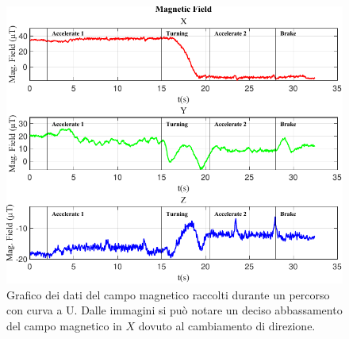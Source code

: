 \documentclass[class=article]{standalone}
\begin{document}
	\begin{center}
		\begin{figure}[h]
			\centering\includegraphics[width=.9\textwidth]{img/Mag CurvaUF.pdf}
			\caption[]{Grafico dei dati del campo magnetico raccolti durante un percorso con curva a U. Dalle immagini si può notare un deciso abbassamento del campo magnetico in \(X\) dovuto al cambiamento di direzione.}
			\label{fig:MagCurvaU}
		\end{figure}
	\end{center}
		
\end{document}
